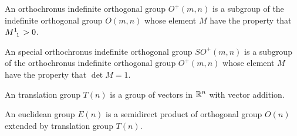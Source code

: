 \documentclass[../main.tex]{subfiles}
\begin{document}
\begin{definition}\label{OrthochronusIndefiniteOrthogonalGroup}
An orthochronus indefinite orthogonal group $O^{+}\left(m,n\right)$ is a subgroup of the indefinite orthogonal group $O\left(m,n\right)$ whose element $M$ have the property that $\tensor{M}{^1_1}>0$.
\end{definition}
\begin{definition}\label{SpecialOrthochronusIndefiniteOrthogonalGroup}
An special orthochronus indefinite orthogonal group $SO^{+}\left(m,n\right)$ is a subgroup of the orthochronus indefinite orthogonal group $O^{+}\left(m,n\right)$ whose element $M$ have the property that $\det{M}=1$.
\end{definition}
\begin{definition}\label{TranslationGroup}
An translation group $T\left(n\right)$ is a group of vectors in $\mathbb{R}^n$ with vector addition.
\end{definition}
\begin{definition}\label{EuclideanGroup}
An euclidean group $E\left(n\right)$ is a semidirect product of orthogonal group $O\left(n\right)$ extended by translation group $T\left(n\right)$.
\end{definition}
\end{document}
